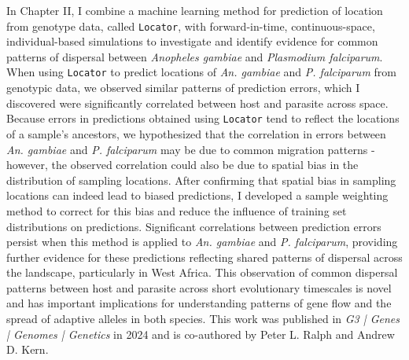 In Chapter II, I combine a machine learning method for prediction of location from genotype data, called \texttt{Locator}, 
with forward-in-time, continuous-space, individual-based simulations to investigate and identify evidence for 
common patterns of dispersal between \textit{Anopheles gambiae} and \textit{Plasmodium falciparum}.
When using \texttt{Locator} to predict locations of \textit{An. gambiae} and \textit{P. falciparum} from genotypic data, 
we observed similar patterns of prediction errors, which I discovered were significantly correlated between host and parasite across space. 
Because errors in predictions obtained using \texttt{Locator} tend to reflect the locations of a sample's ancestors, 
we hypothesized that the correlation in errors between \textit{An. gambiae} and \textit{P. falciparum} 
may be due to common migration patterns - however, the observed correlation could also be due to spatial bias in the distribution
of sampling locations. After confirming that spatial bias in sampling locations can indeed lead to biased predictions,
I developed a sample weighting method to correct for this bias and reduce the influence of training set distributions on predictions.
Significant correlations between prediction errors persist 
when this method is applied to \textit{An. gambiae} and \textit{P. falciparum}, providing further evidence for
these predictions reflecting shared patterns of dispersal across the landscape, particularly in West Africa.
This observation of common dispersal patterns between host and parasite across short evolutionary timescales is novel 
and has important implications for understanding patterns of gene flow and the spread of adaptive alleles in both species.
This work was published in \textit{G3 | Genes | Genomes | Genetics} in 2024 and is co-authored by 
Peter L. Ralph and Andrew D. Kern.


